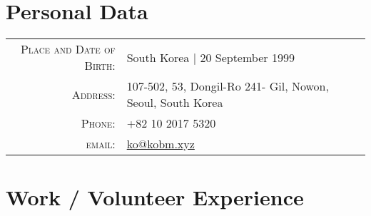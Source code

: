 \documentclass[a4paper,10pt]{article} %
\begin{document}
\pagestyle{empty} %


\par{\bigskip\par} %

\section{Personal Data}

\begin{tabular}{rl}
\textsc{Place and Date of Birth:} & South Korea  | 20 September 1999 \\
\textsc{Address:} & 107-502, 53, Dongil-Ro 241- Gil, Nowon, Seoul, South Korea \\
\textsc{Phone:} & +82 10 2017 5320\\
\textsc{email:} & \href{mailto:ko@kobm.xyz}{ko@kobm.xyz}\\
\end{tabular}


\section{Work / Volunteer Experience}
\end{document}
